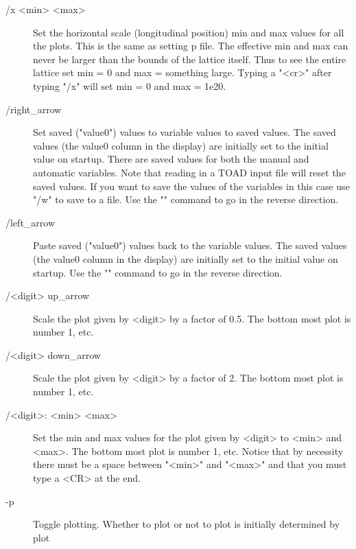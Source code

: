 \begin{description}
\item[/x <min> <max>]
Set the horizontal scale (longitudinal position) min and max values for all
the plots. This is the same as setting p%
file. The effective min and max can never be larger than the bounds of the
lattice itself. Thus to see the entire lattice set min = 0 and max = something
large. Typing a "<cr>" after typing "/x" will set min = 0 and max = 1e20.

\item[/right\_arrow]
Set saved ("value0") values to variable values to saved values. 
The saved values (the value0 column in the display) are initially set to  the
initial value on startup. There are saved values for both the manual and
automatic variables. Note that reading in a TOAD input file will reset the
saved values. If you want to save the values of the variables in this case use
"/w" to save to a file. Use the "" command to go in the
reverse direction.

\item[/left\_arrow]
Paste saved ("value0") values back to the variable values. 
The saved values (the value0 column in the display) are initially set to the
initial value  on startup. Use the "" command to go in the
reverse direction.

\item[/<digit> up\_arrow]
Scale the plot given by <digit> by a factor of 0.5. The bottom most plot
is number 1, etc. 

\item[/<digit> down\_arrow]
Scale the plot given by <digit> by a factor of 2. The bottom most plot is
number 1, etc. 

\item[/<digit>: <min> <max>]
Set the min and max values for the plot given by <digit> to <min>
and <max>. The bottom most plot is number 1, etc. Notice that by
necessity there must be a space between "<min>" and "<max>" and
that you must type a <CR> at the end.

\item[-p]
Toggle plotting. Whether to plot or not to plot is initially determined by
plot%

\end{description}
